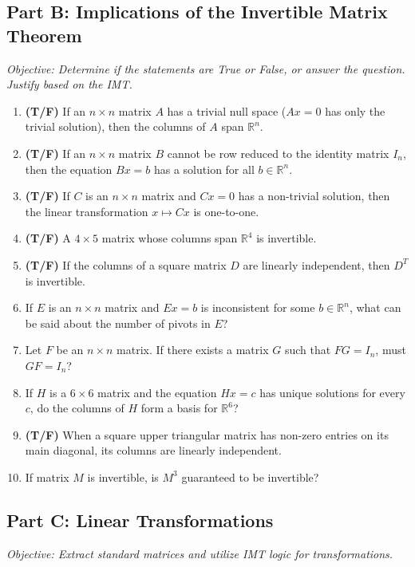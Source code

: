 \documentclass[12pt]{article}
\begin{document}
\subsection*{Part B: Implications of the Invertible Matrix Theorem}
\textit{Objective: Determine if the statements are True or False, or answer the question. Justify based on the IMT.}

\begin{enumerate}[label=\textbf{\arabic*.}, resume]
    \item \textbf{(T/F)} If an $n \times n$ matrix $A$ has a trivial null space ($Ax = 0$ has only the trivial solution), then the columns of $A$ span $\mathbb{R}^n$.
    \item \textbf{(T/F)} If an $n \times n$ matrix $B$ cannot be row reduced to the identity matrix $I_n$, then the equation $Bx = b$ has a solution for all $b \in \mathbb{R}^n$.
    \item \textbf{(T/F)} If $C$ is an $n \times n$ matrix and $Cx = 0$ has a non-trivial solution, then the linear transformation $x \mapsto Cx$ is one-to-one.
    \item \textbf{(T/F)} A $4 \times 5$ matrix whose columns span $\mathbb{R}^4$ is invertible.
    \item \textbf{(T/F)} If the columns of a square matrix $D$ are linearly independent, then $D^T$ is invertible.
    \item If $E$ is an $n \times n$ matrix and $Ex = b$ is inconsistent for some $b \in \mathbb{R}^n$, what can be said about the number of pivots in $E$?
    \item Let $F$ be an $n \times n$ matrix. If there exists a matrix $G$ such that $FG = I_n$, must $GF = I_n$?
    \item If $H$ is a $6 \times 6$ matrix and the equation $Hx = c$ has unique solutions for every $c$, do the columns of $H$ form a basis for $\mathbb{R}^6$?
    \item \textbf{(T/F)} When a square upper triangular matrix has non-zero entries on its main diagonal, its columns are linearly independent.
    \item If matrix $M$ is invertible, is $M^3$ guaranteed to be invertible?
\end{enumerate}

\subsection*{Part C: Linear Transformations}
\textit{Objective: Extract standard matrices and utilize IMT logic for transformations.}
\end{document}
